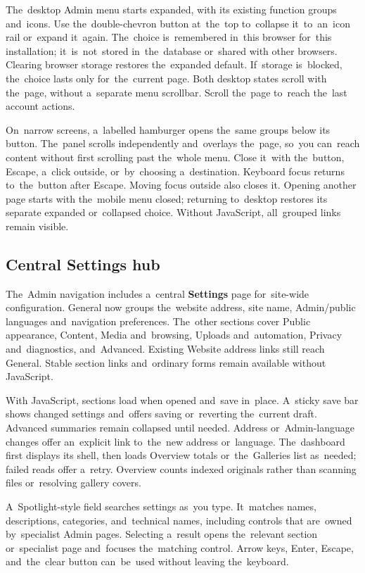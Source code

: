 \documentclass[11pt,a4paper]{article}
\begin{document}
The~desktop Admin menu starts expanded, with its existing function groups
and~icons. Use the~double-chevron button at~the~top to~collapse it~to~an~icon
rail
or~expand it~again. The~choice is~remembered in~this browser for~this
installation; it~is~not~stored in~the~database or~shared with other browsers.
Clearing browser storage restores the~expanded default. If~storage is~blocked,
the~choice lasts only for~the~current page. Both desktop states scroll with
the~page, without a~separate menu scrollbar. Scroll the~page to~reach the~last
account actions.

On~narrow screens, a~labelled hamburger opens the~same groups below its button.
The~panel scrolls independently and~overlays the~page, so~you can~reach content
without first scrolling past the~whole menu. Close it~with the~button, Escape,
a~click outside, or~by~choosing a~destination. Keyboard focus returns
to~the~button after Escape. Moving focus outside also closes it. Opening another
page
starts with the~mobile menu closed; returning to~desktop restores its separate
expanded or~collapsed choice. Without JavaScript, all~grouped links remain
visible.

\subsection{Central Settings hub}

The~Admin navigation includes a~central \textbf{Settings} page for~site-wide
configuration. General now groups the~website address, site name, Admin/public
languages and~navigation preferences. The~other sections cover Public
appearance, Content, Media and~browsing, Uploads and~automation, Privacy
and~diagnostics, and~Advanced. Existing Website address links still reach
General. Stable section links and~ordinary forms remain available without
JavaScript.

With JavaScript, sections load when opened and~save in~place. A~sticky save bar
shows changed settings and~offers saving or~reverting the~current draft.
Advanced summaries remain collapsed until needed. Address or~Admin-language
changes offer an~explicit link to~the~new address or~language. The~dashboard
first displays its shell, then loads Overview totals or~the~Galleries list
as~needed; failed reads offer a~retry. Overview counts indexed originals rather
than scanning files or~resolving gallery covers.

A~Spotlight-style field searches settings as~you type. It~matches names,
descriptions, categories, and~technical names, including controls that are~owned
by~specialist Admin pages. Selecting a~result opens the~relevant section
or~specialist page and~focuses the~matching control. Arrow keys, Enter, Escape,
and~the~clear button can~be~used without leaving the~keyboard.
\end{document}

